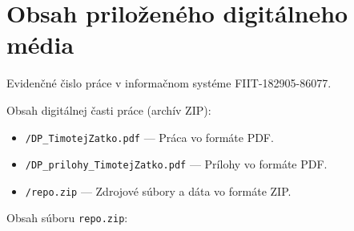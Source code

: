 \chapter{Obsah priloženého digitálneho média \label{cha:cdrom}}

\setcounter{page}{1}

Evidenčné čislo práce v informačnom systéme FIIT-182905-86077.

Obsah digitálnej časti práce (archív ZIP):

\begin{itemize}
    \item \texttt{/DP\_TimotejZatko.pdf} --- Práca vo formáte PDF.
    \item \texttt{/DP\_prilohy\_TimotejZatko.pdf} --- Prílohy vo formáte PDF.
    \item \texttt{/repo.zip} --- Zdrojové súbory a dáta vo formáte ZIP.
\end{itemize}

Obsah súboru \texttt{repo.zip}:

